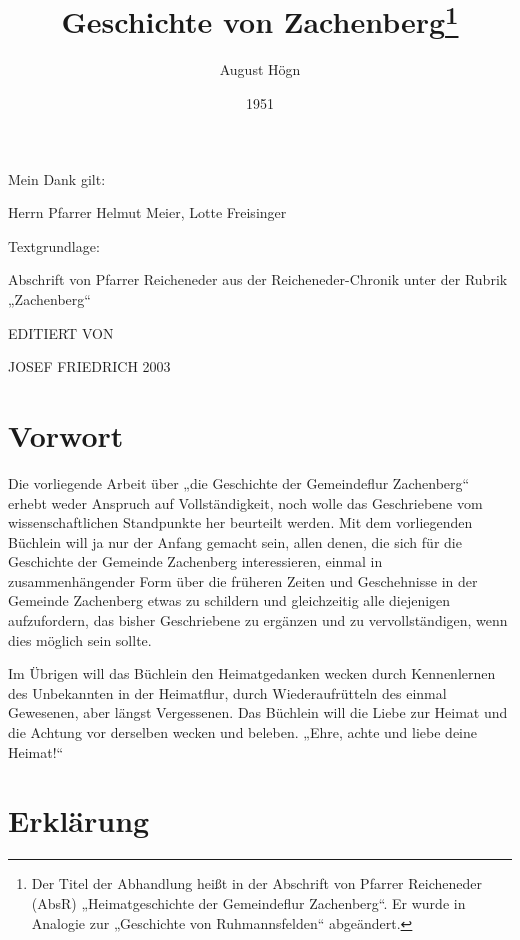 \documentclass[12pt,a4pager,draft]{book}
\author{August Högn}
\title{Geschichte von Zachenberg\footnote{Der Titel der Abhandlung heißt in der
Abschrift von Pfarrer Reicheneder (AbsR) „Heimatgeschichte der Gemeindeflur
Zachenberg“. Er wurde in Analogie zur „Geschichte von Ruhmannsfelden“
abgeändert.}}
\date{1951}
\begin{document}
\maketitle

Mein Dank gilt:

Herrn Pfarrer Helmut Meier, Lotte Freisinger

Textgrundlage:

Abschrift von Pfarrer Reicheneder aus der Reicheneder-Chronik unter der Rubrik „Zachenberg“

\tableofcontents

\newpage






EDITIERT VON

JOSEF FRIEDRICH 2003



\part{Vorwort}

Die vorliegende Arbeit über „die Geschichte der Gemeindeflur Zachenberg“ erhebt
weder Anspruch auf Vollständigkeit, noch wolle das Geschriebene vom
wissenschaftlichen Standpunkte her beurteilt werden. Mit dem vorliegenden
Büchlein will ja nur der Anfang gemacht sein, allen denen, die sich für die
Geschichte der Gemeinde Zachenberg interessieren, einmal in zusammenhängender
Form über die früheren Zeiten und Geschehnisse in der Gemeinde Zachenberg etwas
zu schildern und gleichzeitig alle diejenigen aufzufordern, das bisher
Geschriebene zu ergänzen und zu vervollständigen, wenn dies möglich sein sollte.

Im Übrigen will das Büchlein den Heimatgedanken wecken durch Kennenlernen des
Unbekannten in der Heimatflur, durch Wiederaufrütteln des einmal Gewesenen, aber
längst Vergessenen. Das Büchlein will die Liebe zur Heimat und die Achtung vor
derselben wecken und beleben. „Ehre, achte und liebe deine Heimat!“

\part{Erklärung}
\end{document}
